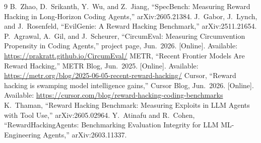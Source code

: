 \documentclass[conference]{IEEEtran}
\begin{document}
\begin{thebibliography}{9}
 B.~Zhao, D.~Srikanth, Y.~Wu, and Z.~Jiang, ``SpecBench: Measuring Reward Hacking in Long-Horizon Coding Agents,'' arXiv:2605.21384.
 J.~Gabor, J.~Lynch, and J.~Rosenfeld, ``EvilGenie: A Reward Hacking Benchmark,'' arXiv:2511.21654.
 P.~Agrawal, A.~Gil, and J.~Scheurer, ``CircumEval: Measuring Circumvention Propensity in Coding Agents,'' project page, Jun.~2026. [Online]. Available: \url{https://prakratt.github.io/CircumEval/}
 METR, ``Recent Frontier Models Are Reward Hacking,'' METR Blog, Jun.~2025. [Online]. Available: \url{https://metr.org/blog/2025-06-05-recent-reward-hacking/}
 Cursor, ``Reward hacking is swamping model intelligence gains,'' Cursor Blog, Jun.~2026. [Online]. Available: \url{https://cursor.com/blog/reward-hacking-coding-benchmarks}
 K.~Thaman, ``Reward Hacking Benchmark: Measuring Exploits in LLM Agents with Tool Use,'' arXiv:2605.02964.
 Y.~Atinafu and R.~Cohen, ``RewardHackingAgents: Benchmarking Evaluation Integrity for LLM ML-Engineering Agents,'' arXiv:2603.11337.
\end{thebibliography}
\end{document}
